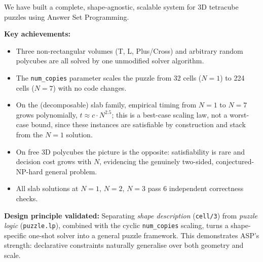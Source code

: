 \documentclass[a4paper,UKenglish,cleveref,autoref]{lipics-v2021}
\begin{document}
We have built a complete, shape-agnostic, scalable system for 3D tetracube
puzzles using Answer Set Programming.

\textbf{Key achievements:}
\begin{itemize}
  \item Three non-rectangular volumes (T, L, Plus/Cross) and arbitrary random
        polycubes are all solved by one unmodified solver algorithm.
  \item The \texttt{num\_copies} parameter scales the puzzle from 32 cells
        ($N=1$) to 224 cells ($N=7$) with no code changes.
  \item On the (decomposable) slab family, empirical timing from $N=1$ to
        $N=7$ grows polynomially, $t \approx c \cdot N^{2.5}$; this is a
        best-case scaling law, not a worst-case bound, since these instances
        are satisfiable by construction and stack from the $N=1$ solution.
  \item On free 3D polycubes the picture is the opposite: satisfiability is
        rare and decision cost grows with $N$, evidencing the genuinely
        two-sided, conjectured-NP-hard general problem.
  \item All slab solutions at $N=1$, $N=2$, $N=3$ pass 6 independent
        correctness checks.
\end{itemize}

\textbf{Design principle validated:}
Separating \emph{shape description} (\texttt{cell/3}) from \emph{puzzle logic}
(\texttt{puzzle.lp}), combined with the cyclic \texttt{num\_copies} scaling,
turns a shape-specific one-shot solver into a general puzzle framework.
This demonstrates ASP's strength: declarative constraints naturally
generalise over both geometry and scale.


\end{document}
